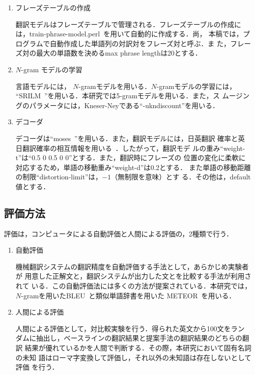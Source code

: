 \documentclass[japanese]{jnlp_1.4}
\begin{document}
\begin{enumerate}

\item{フレーズテーブルの作成}

翻訳モデルはフレーズテーブルで管理される．フレーズテーブルの作成に
は，train-phrase-model.perl~\cite{pharaoh}を用いて自動的に作成する．尚，
本稿では，プログラムで自動作成した単語列の対訳対をフレーズ対と呼ぶ．ま
た，フレーズ対の最大の単語数を決めるmax phrase lengthは20とする．


\item{$N$-gram モデルの学習} 

言語モデルには，
$N$-gramモデルを用いる．$N$-gramモデルの学習には，
``SRILM~\cite{srilm}''を用いる．本研究では5-gramモデルを用いる．また，ス
ムージングのパラメータには，Kneser-Neyである``-ukndiscount''を用いる．


\item{デコーダ}

デコーダは``moses~\cite{moses}''を用いる．また，翻訳モデルには，日英翻訳
確率と英日翻訳確率の相互情報を用いる~\cite{closs}．したがって，翻訳モデ
ルの重み``weight-t''は``0.5 0 0.5 0 0''とする．また，翻訳時にフレーズの
位置の変化に柔軟に対応するため，単語の移動重み``weight-d''は0.2とする．
また単語の移動距離の制限``distortion-limit''は，$-1$（無制限を意味）とす
る．その他は，default値とする．

\end{enumerate}


\subsection{評価方法}

評価は，コンピュータによる自動評価と人間による評価の，2種類で行う．

\begin{enumerate}

\item{自動評価}

機械翻訳システムの翻訳精度を自動評価する手法として，あらかじめ実験者が
用意した正解文と，翻訳システムが出力した文とを比較する手法が利用されて
いる．この自動評価法には多くの方法が提案されている．本研究では，
$N$-gramを用いたBLEU~\cite{BLEU}と類似単語辞書を用いた
METEOR~\cite{METEOR}を用いる．

\item{人間による評価}

人間による評価として，対比較実験を行う．得られた英文から100文をラン
ダムに抽出し，ベースラインの翻訳結果と提案手法の翻訳結果のどちらの翻訳
結果が優れているかを人間で判断する．その際，本研究において固有名詞の未知
語はローマ字変換して評価し，それ以外の未知語は存在しないとして評価
を行う．

\end{enumerate}
\end{document}
